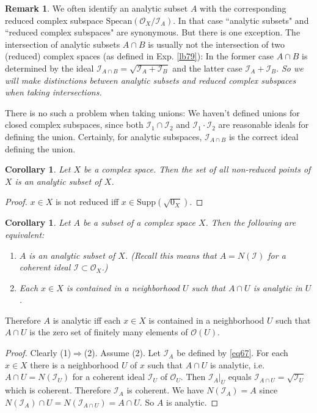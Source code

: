 \documentclass[12pt,b5paper,notitlepage]{report}
\theoremstyle{definition}
\newtheorem{rem}[df]{Remark}
\theoremstyle{plain}
\newtheorem{co}[df]{Corollary}
\newcommand{\mc}{\mathcal}
\newcommand{\scr}{\mathscr}
\newcommand{\Supp}{\mathrm{Supp}}
\newcommand{\Specan}{\mathrm{Specan}}
\numberwithin{equation}{section}
\begin{document}
\begin{rem}\label{lb127}
We often identify an analytic subset $A$ with the corresponding reduced complex subspace $\Specan(\scr O_X/\scr I_A)$. In that case ``analytic subsets" and ``reduced complex subspaces" are synonymous. But there is one exception. The intersection of analytic subsets $A\cap B$ is usually not the intersection of two (reduced) complex spaces (as defined in Exp. \ref{lb79}): In the former case $A\cap B$ is determined by the ideal $\scr I_{A\cap B}=\sqrt{\scr I_A+\scr I_B}$ and the latter case $\scr I_A+\scr I_B$. {\color{red}\emph{So we will make distinctions between analytic subsets and reduced complex subspaces when taking intersections.}} 

There is no such a problem when taking unions: We haven't defined unions for closed complex subspaces, since both $\mc I_1\cap \mc I_2$ and $\mc I_1\cdot\mc I_2$ are reasonable ideals for defining the union. Certainly, for analytic subspaces, $\scr I_{A\cap B}$ is the correct ideal defining the union.   \hfill\qedsymbol
\end{rem}



\begin{co}\label{lb135}
Let $X$ be a complex space. Then the set of all non-reduced points of $X$ is an analytic subset of $X$.
\end{co}


\begin{proof}
$x\in X$ is not reduced iff $x\in\Supp(\sqrt{0_X})$.
\end{proof}



\begin{co}\label{lb136}
Let $A$ be a subset of a complex space $X$. Then the following are equivalent:
\begin{enumerate}[label=(\arabic*)]
\item $A$ is an analytic subset of $X$. (Recall this means that $A=N(\mc I)$ for a coherent ideal $\mc I\subset\scr O_X$.)
\item Each $x\in X$ is contained in a neighborhood $U$ such that $A\cap U$ is analytic in $U$.
\end{enumerate}
\end{co}


Therefore $A$ is analytic iff each $x\in X$ is contained in a neighborhood $U$ such that $A\cap U$ is the zero set of finitely many elements of $\scr O(U)$.


\begin{proof}
Clearly (1)$\Rightarrow$(2). Assume (2). Let $\scr I_A$ be defined by \eqref{eq67}. For each $x\in X$ there is a neighborhood $U$ of $x$ such that $A\cap U$ is analytic, i.e. $A\cap U=N(\mc I_U)$ for a coherent ideal $\mc I_U$ of $\scr O_U$. Then $\scr I_A|_U$ equals $\scr I_{A\cap U}=\sqrt{\mc I_U}$ which is coherent. Therefore $\scr I_A$ is coherent. We have $N(\scr I_A)=A$ since $N(\scr I_A)\cap U=N(\scr I_{A\cap U})=A\cap U$. So $A$ is analytic.
\end{proof}
\end{document}
